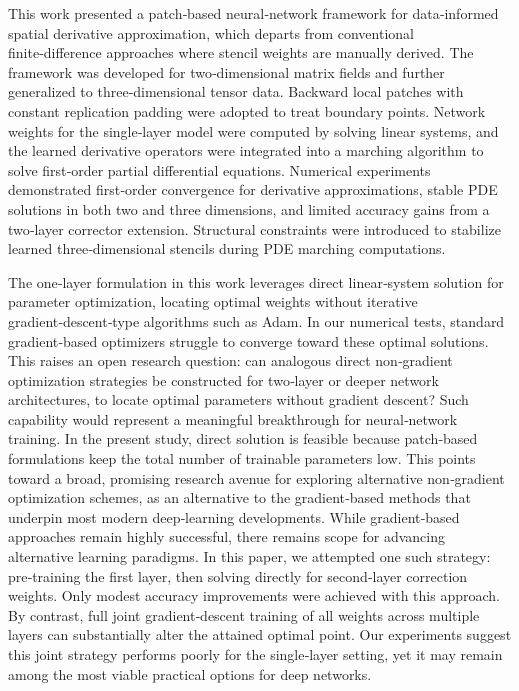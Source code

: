 \documentclass[pdflatex,sn-mathphys-num]{sn-jnl}%
\theoremstyle{thmstyleone}%
\theoremstyle{thmstyletwo}%
\theoremstyle{thmstylethree}%
\begin{document}
{This work presented a patch‑based neural‑network framework for data‑informed spatial derivative approximation, which departs from conventional finite‑difference approaches where stencil weights are manually derived. The framework was developed for two‑dimensional matrix fields and further generalized to three‑dimensional tensor data. Backward local patches with constant replication padding were adopted to treat boundary points. Network weights for the single‑layer model were computed by solving linear systems, and the learned derivative operators were integrated into a marching algorithm to solve first‑order partial differential equations. Numerical experiments demonstrated first‑order convergence for derivative approximations, stable PDE solutions in both two and three dimensions, and limited accuracy gains from a two‑layer corrector extension. Structural constraints were introduced to stabilize learned three‑dimensional stencils during PDE marching computations.

The one‑layer formulation in this work leverages direct linear‑system solution for parameter optimization, locating optimal weights without iterative gradient‑descent‑type algorithms such as Adam. In our numerical tests, standard gradient‑based optimizers struggle to converge toward these optimal solutions. This raises an open research question: can analogous direct non‑gradient optimization strategies be constructed for two‑layer or deeper network architectures, to locate optimal parameters without gradient descent? Such capability would represent a meaningful breakthrough for neural‑network training. In the present study, direct solution is feasible because patch‑based formulations keep the total number of trainable parameters low. This points toward a broad, promising research avenue for exploring alternative non‑gradient optimization schemes, as an alternative to the gradient‑based methods that underpin most modern deep‑learning developments. While gradient‑based approaches remain highly successful, there remains scope for advancing alternative learning paradigms. In this paper, we attempted one such strategy: pre‑training the first layer, then solving directly for second‑layer correction weights. Only modest accuracy improvements were achieved with this approach. By contrast, full joint gradient‑descent training of all weights across multiple layers can substantially alter the attained optimal point. Our experiments suggest this joint strategy performs poorly for the single‑layer setting, yet it may remain among the most viable practical options for deep networks.

}
\end{document}
